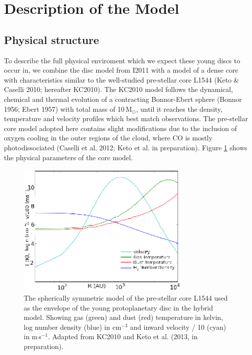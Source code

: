 \documentclass[useAMS,usenatbib]{mn2e}
\begin{document}
\section{Description of the Model} \label{sec:description_model}

\subsection{Physical structure} \label{subsec:physical_structure}

To describe the full physical enviroment which we expect these young discs to occur in, we combine the disc model from I2011 with a model of a dense core with characteristics similar to the well-studied pre-stellar core L1544 (Keto \& Caselli 2010; hereafter KC2010). The KC2010 model follows the dynamical, chemical and thermal evolution of a contracting Bonnor-Ebert sphere (Bonnor 1956; Ebert 1957) with total mass of 10\,M$_{\odot}$, until it reaches the density, temperature and velocity profiles which best match observations. The pre-stellar core model adopted here contains slight modifications due to the inclusion of oxygen cooling in the outer regions of the cloud, where CO is mostly photodissociated (Caselli et al. 2012; Keto et al. in preparation). Figure \ref{fig:l1544_model} shows the physical parameters of the core model. \newline

\begin{figure}
 \includegraphics[width=84mm]{Figures/model/L1544model_used_legend_small.eps}
 \caption{The spherically symmetric model of the pre-stellar core L1544 used as the envelope of the young protoplanetary disc in the hybrid model. Showing gas (green) and dust (red) temperature in kelvin, log number density (blue) in cm$^{-3}$ and inward velocity / 10 (cyan) in m$\,$s$^{-1}$. Adapted from KC2010 and Keto et al. (2013, in preparation).}
 \label{fig:l1544_model}
\end{figure}
\end{document}

